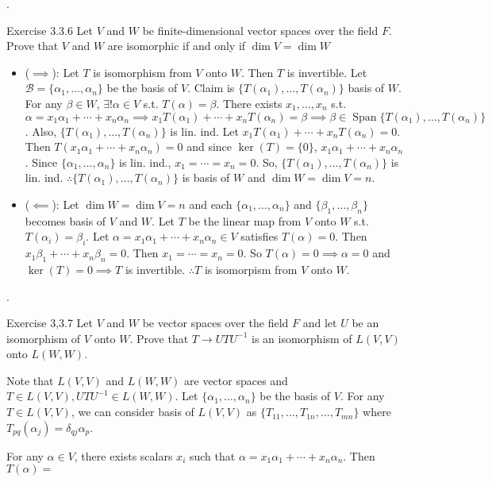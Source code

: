 \documentclass[8pt]{beamer}
\newcommand{\mc}[1]{\mathcal{#1}}
\newcommand{\Span}{\operatorname{Span}}
\begin{document}
\begin{frame}{.}
    \begin{block}{Exercise 3.3.6}
        Let $V$ and $W$ be finite-dimensional vector spaces over the field $F$. Prove that $V$ and $W$ are isomorphic if and only if $\dim V = \dim W$
    \end{block}
    \begin{itemize}
        \item ($\implies$): Let $T$ is isomorphism from $V$ onto $W$.
        Then $T$ is invertible.
        Let $\mc{B} = \{\alpha_1, \dots, \alpha_n\}$ be the basis of $V$.
        Claim is $\{T(\alpha_1), \dots, T(\alpha_n)\}$ basis of $W$.
        For any $\beta \in W$, $\exists! \alpha \in V$ s.t. $T(\alpha) = \beta$.
        There exists $x_1, \dots, x_n$ s.t. $\alpha = x_1 \alpha_1 + \cdots + x_n \alpha_n \implies x_1 T(\alpha_1) + \cdots + x_n T(\alpha_n) = \beta \implies \beta \in \Span \{T(\alpha_1) ,\dots, T(\alpha_n)\}$.
        Also, $\{T(\alpha_1), \dots, T(\alpha_n)\}$ is lin. ind. Let $x_1 T(\alpha_1) + \cdots + x_n T(\alpha_n) = 0$. Then $T(x_1 \alpha_1 + \cdots + x_n \alpha_n) = 0 $ and since $\ker (T) = \{0\}$, $x_1 \alpha_1 + \cdots + x_n \alpha_n$.
        Since $\{\alpha_1, \dots, \alpha_n\}$ is lin. ind., $x_1 = \cdots = x_n = 0$.
        So, $\{T(\alpha_1), \dots, T(\alpha_n)\}$ is lin. ind.
        $\therefore \{T(\alpha_1), \dots, T(\alpha_n)\}$ is basis of $W$ and $\dim W = \dim V = n$.
        \item ($\impliedby$): Let $\dim W = \dim V = n$ and each $\{\alpha_1, \dots, \alpha_n\}$ and $\{\beta_1, \dots, \beta_n\}$ becomes basis of $V$ and $W$. Let $T$ be the linear map from $V$ onto $W$ s.t. $T(\alpha_i) = \beta_i$. Let $\alpha = x_1 \alpha_1 + \cdots + x_n \alpha_n \in V$ satisfies $T(\alpha) = 0$.
        Then $x_1 \beta_1 + \cdots + x_n \beta_n = 0$. Then $x_1 = \cdots = x_n =0 $. So $T(\alpha) = 0 \implies \alpha = 0$ and $\ker (T) = 0 \implies T$ is invertible.
        $\therefore T$ is isomorpism from $V$ onto $W$.
    \end{itemize}
\end{frame}

\begin{frame}{.}
    \begin{block}{Exercise 3,3.7}
        Let $V$ and $W$ be vector spaces over the field $F$ and let $U$ be an isomorphism of $V$ onto $W$.
        Prove that $T \to UT U^{-1}$ is an isomorphism of $L(V,V)$ onto $L(W,W)$.
    \end{block}

    Note that $L(V,V)$ and $L(W,W)$ are vector spaces and $T \in L(V,V), U T U^{-1} \in L(W,W)$.
    Let $\{\alpha_1, \dots, \alpha_n\}$ be the basis of $V$.
    For any $T \in L(V,V)$, we can consider basis of $L(V,V)$ as $\{T_{11}, \dots, T_{1n}, \dots, T_{mn}\}$ where $T_{pq}(\alpha_j) = \delta_{qj} \alpha_p$.

    For any $\alpha \in V$, there exists scalars $x_i$ such that $\alpha = x_1 \alpha_1 + \cdots + x_n \alpha_n$. Then $T(\alpha) = $


\end{frame}
\end{document}
